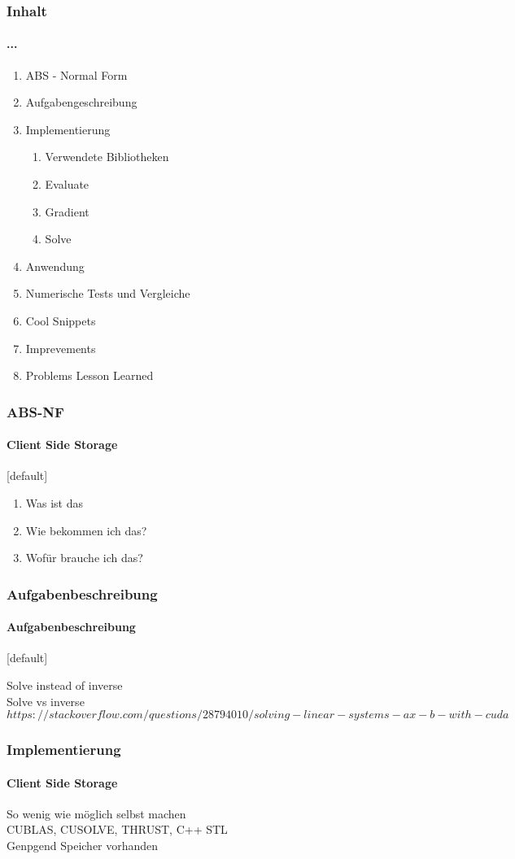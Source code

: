 \begin{frame}
\frametitle{Inhalt}
\framesubtitle{...}
	\begin{enumerate}
		\item ABS - Normal Form
		\item Aufgabengeschreibung
		\item Implementierung
		\begin{enumerate}
			\item Verwendete Bibliotheken
			\item Evaluate
			\item Gradient
			\item Solve
		\end{enumerate}
		\item Anwendung
		\item Numerische Tests und Vergleiche
		\item Cool Snippets
		\item Imprevements
		\item Problems Lesson Learned
	\end{enumerate}
\end{frame}
\begin{frame}
\frametitle{ABS-NF}
\framesubtitle{Client Side Storage}
	[default]
	\begin{enumerate}
		\item Was ist das
		\item Wie bekommen ich das?
		\item Wofür brauche ich das?
	\end{enumerate}	
\end{frame}
\begin{frame}
\frametitle{Aufgabenbeschreibung}
\framesubtitle{Aufgabenbeschreibung}
[default]

Solve instead of inverse \\
Solve vs inverse
$ https://stackoverflow.com/questions/28794010/solving-linear-systems-ax-b-with-cuda$



\end{frame}
\begin{frame}
\frametitle{Implementierung}
\framesubtitle{Client Side Storage}
 So wenig wie möglich selbst machen \\
 CUBLAS, CUSOLVE, THRUST, C++ STL \\
 Genpgend Speicher vorhanden
\end{frame}
